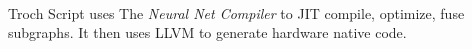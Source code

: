 \begin{defnbox}\nospacing
    \begin{defn}\label{defn:torch_script}\leavevmode\\
        Troch Script uses The \textit{Neural Net Compiler}  to JIT compile, optimize, fuse subgraphs.
        It then uses LLVM to generate hardware native code.
    \end{defn}
\end{defnbox}


